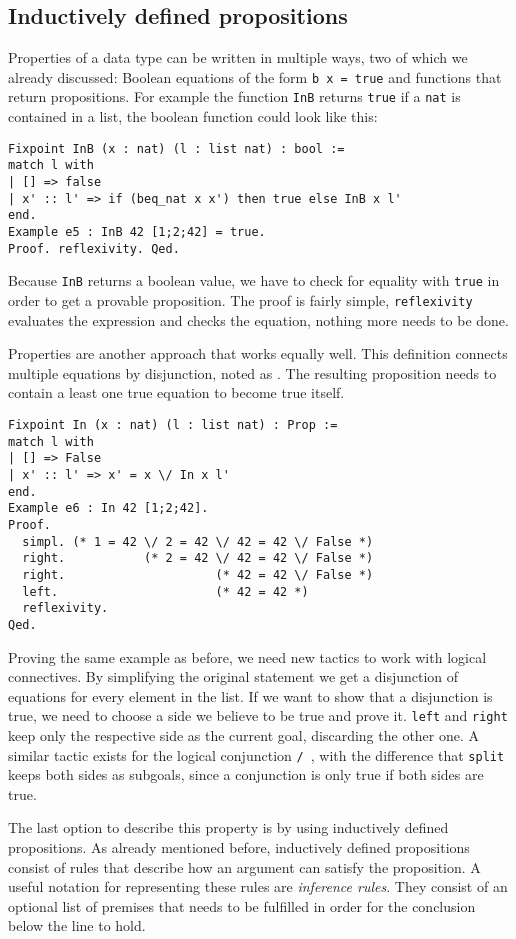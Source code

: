 \documentclass[fleqn]{scrreprt}
\newcommand{\coqinline}[1]{\texttt{#1}}
\begin{document}
\subsection{Inductively defined propositions}
Properties of a data type can be written in multiple ways, two of which we already discussed: Boolean equations of the form \coqinline{b x = true} and functions that return propositions. For example the function \coqinline{InB} returns \coqinline{true} if a \coqinline{nat} is contained in a list, the boolean function could look like this:
\begin{verbatim}
Fixpoint InB (x : nat) (l : list nat) : bool :=
match l with
| [] => false
| x' :: l' => if (beq_nat x x') then true else InB x l'
end.
Example e5 : InB 42 [1;2;42] = true.
Proof. reflexivity. Qed.
\end{verbatim}
Because \coqinline{InB} returns a boolean value, we have to check for equality with \coqinline{true} in order to get a provable proposition. The proof is fairly simple, \coqinline{reflexivity} evaluates the expression and checks the equation, nothing more needs to be done.
\par 
Properties are another approach that works equally well. This definition connects multiple equations by disjunction, noted as \coqinline{\/}. The resulting proposition needs to contain a least one true equation to become true itself.
\begin{verbatim}
Fixpoint In (x : nat) (l : list nat) : Prop :=
match l with
| [] => False
| x' :: l' => x' = x \/ In x l'
end.
Example e6 : In 42 [1;2;42].
Proof. 
  simpl. (* 1 = 42 \/ 2 = 42 \/ 42 = 42 \/ False *)
  right.           (* 2 = 42 \/ 42 = 42 \/ False *)
  right.                     (* 42 = 42 \/ False *)
  left.                      (* 42 = 42 *)
  reflexivity.
Qed.
\end{verbatim}
Proving the same example as before, we need new tactics to work with logical connectives. By simplifying the original statement we get a disjunction of equations for every element in the list. If we want to show that a disjunction is true, we need to choose a side we believe to be true and prove it. \coqinline{left} and \coqinline{right} keep only the respective side as the current goal, discarding the other one. A similar tactic exists for the logical conjunction \coqinline{/\ }, with the difference that \coqinline{split} keeps both sides as subgoals, since a conjunction is only true if both sides are true.
\par
The last option to describe this property is by using inductively defined propositions. As already mentioned before, inductively defined propositions consist of rules that describe how an argument can satisfy the proposition. A useful notation for representing these rules are \textit{inference rules}. They consist of an optional list of premises that needs to be fulfilled in order for the conclusion below the line to hold.
\end{document}
